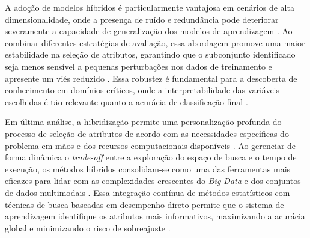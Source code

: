 A adoção de modelos híbridos é particularmente vantajosa em cenários de alta dimensionalidade, onde a presença de ruído e redundância pode deteriorar severamente a capacidade de generalização dos modelos de aprendizagem \cite{villar2022reduccao, salhi2025optimizing, ferreira2014feature}. Ao combinar diferentes estratégias de avaliação, essa abordagem promove uma maior estabilidade na seleção de atributos, garantindo que o subconjunto identificado seja menos sensível a pequenas perturbações nos dados de treinamento e apresente um viés reduzido \cite{villar2022reduccao, salhi2025optimizing}. Essa robustez é fundamental para a descoberta de conhecimento em domínios críticos, onde a interpretabilidade das variáveis escolhidas é tão relevante quanto a acurácia de classificação final \cite{salhi2025optimizing}.

Em última análise, a hibridização permite uma personalização profunda do processo de seleção de atributos de acordo com as necessidades específicas do problema em mãos e dos recursos computacionais disponíveis \cite{sym14101955,BARBIERI2024123667}. Ao gerenciar de forma dinâmica o \textit{trade-off} entre a exploração do espaço de busca e o tempo de execução, os métodos híbridos consolidam-se como uma das ferramentas mais eficazes para lidar com as complexidades crescentes do \textit{Big Data} e dos conjuntos de dados multimodais \cite{bolon2018scalability,EBRAHIMIWARKIANI2025129372,SolorioFernandez2022}. Essa integração contínua de métodos estatísticos com técnicas de busca baseadas em desempenho direto permite que o sistema de aprendizagem identifique os atributos mais informativos, maximizando a acurácia global e minimizando o risco de sobreajuste \cite{sym14101955,BARBIERI2024123667,EBRAHIMIWARKIANI2025129372,SolorioFernandez2022}.
